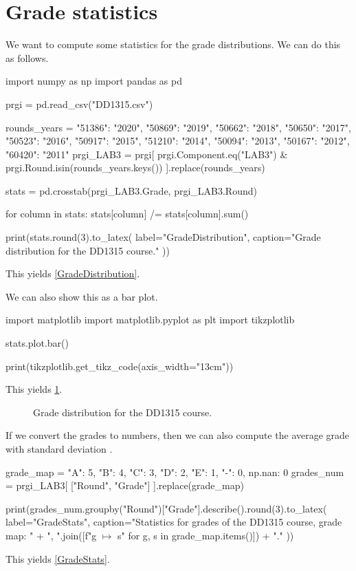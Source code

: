 \mode*
\section{Grade statistics}

We want to compute some statistics for the grade distributions.
We can do this as follows.
\begin{pyblock}[statstest][numbers=left]
import numpy as np
import pandas as pd

prgi = pd.read_csv("DD1315.csv")

rounds_years = {
  "51386": "2020",
  "50869": "2019",
  "50662": "2018",
  "50650": "2017",
  "50523": "2016",
  "50917": "2015",
  "51210": "2014",
  "50094": "2013",
  "50167": "2012",
  "60420": "2011"
}
prgi_LAB3 = prgi[
  prgi.Component.eq("LAB3") & prgi.Round.isin(rounds_years.keys())
].replace(rounds_years)

stats = pd.crosstab(prgi_LAB3.Grade, prgi_LAB3.Round)

for column in stats:
  stats[column] /= stats[column].sum()

print(stats.round(3).to_latex(
  label="GradeDistribution",
  caption="Grade distribution for the DD1315 course."
))
\end{pyblock}
This yields \cref{GradeDistribution}.

\stdoutpythontex

We can also show this as a bar plot.
\begin{pyblock}[statstest][numbers=left,firstnumber=last]
import matplotlib
import matplotlib.pyplot as plt
import tikzplotlib

stats.plot.bar()

print(tikzplotlib.get_tikz_code(axis_width="13cm"))
\end{pyblock}
This yields \cref{GradeDistributionFig}.

\begin{figure}
  \centering
  \stdoutpythontex
  \caption{Grade distribution for the DD1315 course.}
  \label{GradeDistributionFig}
\end{figure}

If we convert the grades to numbers, then we can also compute the average grade 
with standard deviation \etc.
\begin{pyblock}[statstest][numbers=left,firstnumber=last]
grade_map = {
  "A": 5, "B": 4, "C": 3, "D": 2, "E": 1, "-": 0, np.nan: 0
}
grades_num = prgi_LAB3[ ["Round", "Grade"] ].replace(grade_map)

print(grades_num.groupby("Round")["Grade"].describe().round(3).to_latex(
  label="GradeStats",
  caption="Statistics for grades of the DD1315 course, grade map: " +
    ", ".join([f"{g} $\mapsto$ {s}" for g, s in grade_map.items()]) + "."
))
\end{pyblock}
This yields \cref{GradeStats}.

